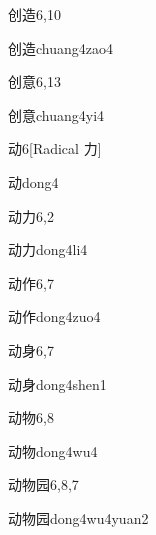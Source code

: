 \begin{entry}{创造}{6,10}
  \begin{phonetics}{创造}{chuang4zao4}
  \end{phonetics}
\end{entry}

\begin{entry}{创意}{6,13}
  \begin{phonetics}{创意}{chuang4yi4}
  \end{phonetics}
\end{entry}

\begin{entry}{动}{6}[Radical 力]
  \begin{phonetics}{动}{dong4}
  \end{phonetics}
\end{entry}

\begin{entry}{动力}{6,2}
  \begin{phonetics}{动力}{dong4li4}
  \end{phonetics}
\end{entry}

\begin{entry}{动作}{6,7}
  \begin{phonetics}{动作}{dong4zuo4}
  \end{phonetics}
\end{entry}

\begin{entry}{动身}{6,7}
  \begin{phonetics}{动身}{dong4shen1}
  \end{phonetics}
\end{entry}

\begin{entry}{动物}{6,8}
  \begin{phonetics}{动物}{dong4wu4}
  \end{phonetics}
\end{entry}

\begin{entry}{动物园}{6,8,7}
  \begin{phonetics}{动物园}{dong4wu4yuan2}
  \end{phonetics}
\end{entry}

